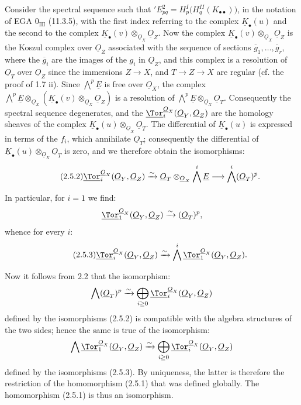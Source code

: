 Consider the spectral sequence such that \({}'E^2_{pq}=H^I_p\bigl(H^{II}_q(K_{\bullet\bullet})\bigr)\), in the notation of EGA \(0_{\mathrm{III}}\) (11.3.5), with the first index referring to the complex \(\underline{K}_\bullet(u)\) and the second to the complex \(\underline{K}_\bullet(v)\otimes_{\underline{O}_X}\underline{O}_Z\). Now the complex \(\underline{K}_\bullet(v)\otimes_{\underline{O}_X}\underline{O}_Z\) is the Koszul complex over \(\underline{O}_Z\) associated with the sequence of sections \(\overline g_1,\ldots,\overline g_r\), where the \(\overline g_i\) are the images of the \(g_i\) in \(\underline{O}_Z\), and this complex is a resolution of \(\underline{O}_T\) over \(\underline{O}_Z\) since the immersions \(Z\to X\), and \(T\to Z\to X\) are regular (cf. the proof of 1.7 ii). Since \(\bigwedge^p\underline{E}\) is free over \(\underline{O}_X\), the complex \(\bigwedge^p\underline{E}\otimes_{\underline{O}_X}(\underline{K}_\bullet(v)\otimes_{\underline{O}_X}\underline{O}_Z)\) is a resolution of \(\bigwedge^p\underline{E}\otimes_{\underline{O}_X}\underline{O}_T\). Consequently the spectral sequence degenerates, and the \(\underline{\Tor}_i^{\underline{O}_X}(\underline{O}_Y,\underline{O}_Z)\) are the homology sheaves of the complex \(\underline{K}_\bullet(u)\otimes_{\underline{O}_X}\underline{O}_T\). The differential of \(\underline{K}_\bullet(u)\) is expressed in terms of the \(f_i\), which annihilate \(\underline{O}_T\); consequently the differential of \(\underline{K}_\bullet(u)\otimes_{\underline{O}_X}\underline{O}_T\) is zero, and we therefore obtain the isomorphisms:
\begin{equation}\tag{2.5.2}
\underline{\Tor}_i^{\underline{O}_X}(\underline{O}_Y,\underline{O}_Z)
\xrightarrow{\sim}
\underline{O}_T\otimes_{\underline{O}_X}\bigwedge^i\underline{E}
\longrightarrow
\bigwedge^i(\underline{O}_T)^p.
\end{equation}

In particular, for \(i=1\) we find:
\[
\underline{\Tor}_1^{\underline{O}_X}(\underline{O}_Y,\underline{O}_Z)\xrightarrow{\sim}(\underline{O}_T)^p,
\]
whence for every \(i\):
\begin{equation}\tag{2.5.3}
\underline{\Tor}_i^{\underline{O}_X}(\underline{O}_Y,\underline{O}_Z)
\xrightarrow{\sim}
\bigwedge^i\underline{\Tor}_1^{\underline{O}_X}(\underline{O}_Y,\underline{O}_Z).
\end{equation}

%
Now it follows from 2.2 that the isomorphism:
\[
\bigwedge(\underline{O}_T)^p\xrightarrow{\sim}
\bigoplus_{i\ge0}\underline{\Tor}_i^{\underline{O}_X}(\underline{O}_Y,\underline{O}_Z)
\]
defined by the isomorphisms (2.5.2) is compatible with the algebra structures of the two sides; hence the same is true of the isomorphism:
\[
\bigwedge\underline{\Tor}_1^{\underline{O}_X}(\underline{O}_Y,\underline{O}_Z)\xrightarrow{\sim}
\bigoplus_{i\ge0}\underline{\Tor}_i^{\underline{O}_X}(\underline{O}_Y,\underline{O}_Z)
\]
defined by the isomorphisms (2.5.3). By uniqueness, the latter is therefore the restriction of the homomorphism (2.5.1) that was defined globally. The homomorphism (2.5.1) is thus an isomorphism.

